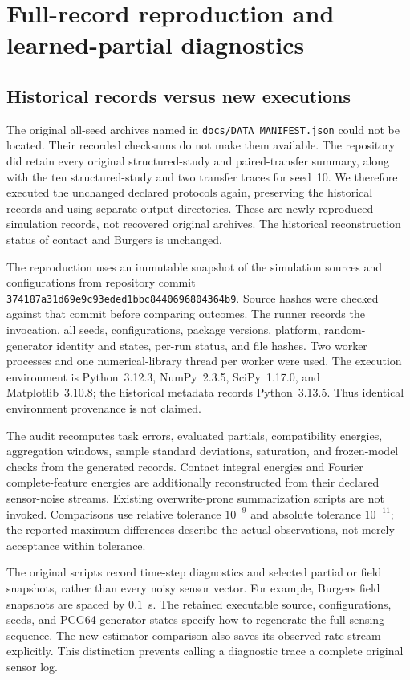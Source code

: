 \section{Full-record reproduction and learned-partial diagnostics}
\label{sec:reproduction_audit}

\subsection{Historical records versus new executions}
The original all-seed archives named in \texttt{docs/DATA\_MANIFEST.json}
could not be located. Their recorded checksums do not make them available.
The repository did retain every original structured-study and paired-transfer
summary, along with the ten structured-study and two transfer traces for seed~10.
We therefore executed the unchanged declared protocols again, preserving
the historical records and using separate output directories. These are
newly reproduced simulation records, not recovered original archives.
The historical reconstruction status of contact and Burgers is unchanged.

The reproduction uses an immutable snapshot of the simulation sources and
configurations from repository commit
\texttt{374187a31d69e9c93eded1bbc8440696804364b9}.
Source hashes were checked against that commit before comparing outcomes.
The runner records the invocation, all seeds, configurations, package
versions, platform, random-generator identity and states, per-run status,
and file hashes. Two worker processes and one numerical-library thread per
worker were used. The execution environment is Python~3.12.3,
NumPy~2.3.5, SciPy~1.17.0, and Matplotlib~3.10.8; the historical metadata
records Python~3.13.5. Thus identical environment provenance is not claimed.



The audit recomputes task errors, evaluated partials, compatibility
energies, aggregation windows, sample standard deviations, saturation,
and frozen-model checks from the generated records. Contact integral
energies and Fourier complete-feature energies are additionally
reconstructed from their declared sensor-noise streams. Existing
overwrite-prone summarization scripts are not invoked. Comparisons use
relative tolerance $10^{-9}$ and absolute tolerance $10^{-11}$;
the reported maximum differences describe the actual observations, not
merely acceptance within tolerance.

The original scripts record time-step diagnostics and selected partial or
field snapshots, rather than every noisy sensor vector. For example,
Burgers field snapshots are spaced by $0.1$~s. The retained executable
source, configurations, seeds, and PCG64 generator states specify how to
regenerate the full sensing sequence. The new estimator comparison also
saves its observed rate stream explicitly. This distinction prevents
calling a diagnostic trace a complete original sensor log.

